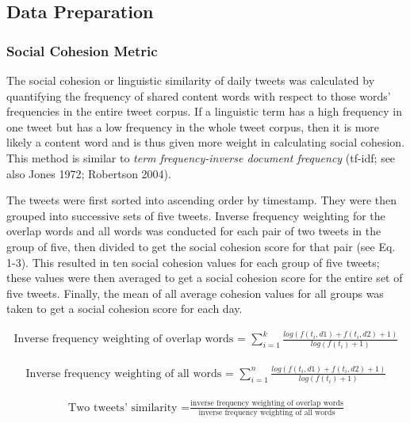 \documentclass[
  english,
  man]{apa6}
\begin{document}
\hypertarget{data-preparation}{%
\subsection{Data Preparation}\label{data-preparation}}

\hypertarget{social-cohesion-metric}{%
\subsubsection{Social Cohesion Metric}\label{social-cohesion-metric}}

The social cohesion or linguistic similarity of daily tweets was calculated by
quantifying the frequency of shared content words with respect to those words'
frequencies in the entire tweet corpus. If a linguistic term has a high
frequency in one tweet but has a low frequency in the whole tweet corpus, then
it is more likely a content word and is thus given more weight in calculating
social cohesion. This method is similar to \emph{term frequency-inverse document
frequency} (tf-idf; see also Jones 1972; Robertson 2004).

The tweets were first sorted into ascending order by timestamp. They were then
grouped into successive sets of five tweets. Inverse frequency weighting for the
overlap words and all words was conducted for each pair of two tweets in the
group of five, then divided to get the social cohesion score for that pair (see
Eq. 1-3). This resulted in ten social cohesion values for each group of five
tweets; these values were then averaged to get a social cohesion score for the
entire set of five tweets. Finally, the mean of all average cohesion values for
all groups was taken to get a social cohesion score for each day.

\begin{align}
\text{Inverse frequency weighting of overlap words = }\sum_{i=1}^k
\frac{log(f(t_i, d1) + f(t_i, d2) + 1)}{log(f(t_i) + 1)}
\end{align}

\begin{align}
\text{Inverse frequency weighting of all words = }\sum_{i=1}^n \frac{log(f(t_i,
d1) + f(t_i, d2) + 1)}{log(f(t_i) + 1)}
\end{align}

\begin{align}
\text{Two tweets' similarity =}\frac{\text{inverse frequency weighting of overlap
words}}{\text{inverse frequency weighting of all words}}
\end{align}
\end{document}
